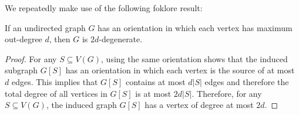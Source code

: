 \documentclass{patmorin}
\begin{document}
We repeatedly make use of the following foklore result:

\begin{obs}\label{orientation_to_degeneracy}
  If an undirected graph $G$ has an orientation in which each vertex has maximum out-degree $d$, then $G$ is $2d$-degenerate.
\end{obs}

\begin{proof}
  For any $S\subseteq V(G)$, using the same orientation shows that the induced subgraph $G[S]$ has an orientation in which each vertex is the source of at most $d$ edges.  This implies that $G[S]$ contains at most $d|S|$ edges and therefore the total degree of all vertices in $G[S]$ is at most $2d|S|$.  Therefore, for any $S\subseteq V(G)$, the induced graph $G[S]$ has a vertex of degree at most $2d$.
\end{proof}
\end{document}
